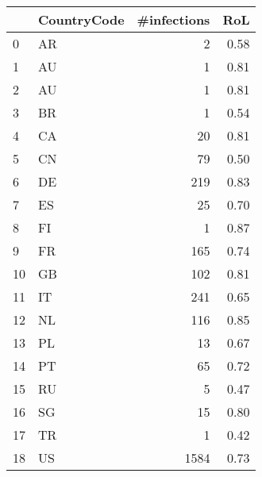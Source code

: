 \begin{tabular}{llrr}
\toprule
{} & CountryCode &  \#infections &   RoL \\
\midrule
0  &          AR &            2 &  0.58 \\
1  &          AU &            1 &  0.81 \\
2  &          AU &            1 &  0.81 \\
3  &          BR &            1 &  0.54 \\
4  &          CA &           20 &  0.81 \\
5  &          CN &           79 &  0.50 \\
6  &          DE &          219 &  0.83 \\
7  &          ES &           25 &  0.70 \\
8  &          FI &            1 &  0.87 \\
9  &          FR &          165 &  0.74 \\
10 &          GB &          102 &  0.81 \\
11 &          IT &          241 &  0.65 \\
12 &          NL &          116 &  0.85 \\
13 &          PL &           13 &  0.67 \\
14 &          PT &           65 &  0.72 \\
15 &          RU &            5 &  0.47 \\
16 &          SG &           15 &  0.80 \\
17 &          TR &            1 &  0.42 \\
18 &          US &         1584 &  0.73 \\
\bottomrule
\end{tabular}
